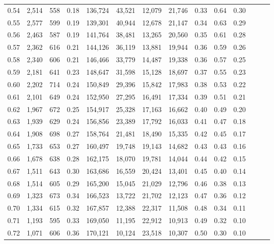 \begin{tabular}{rrrrrrrrrrrrrr}
0.54 &  2,514 &  558 &  0.18 &  136,724 &   43,521 &  12,079 &  21,746 &  0.33 &  0.64 &      0.30 \\
0.55 &  2,577 &  599 &  0.19 &  139,301 &   40,944 &  12,678 &  21,147 &  0.34 &  0.63 &      0.29 \\
0.56 &  2,463 &  587 &  0.19 &  141,764 &   38,481 &  13,265 &  20,560 &  0.35 &  0.61 &      0.28 \\
0.57 &  2,362 &  616 &  0.21 &  144,126 &   36,119 &  13,881 &  19,944 &  0.36 &  0.59 &      0.26 \\
0.58 &  2,340 &  606 &  0.21 &  146,466 &   33,779 &  14,487 &  19,338 &  0.36 &  0.57 &      0.25 \\
0.59 &  2,181 &  641 &  0.23 &  148,647 &   31,598 &  15,128 &  18,697 &  0.37 &  0.55 &      0.23 \\
0.60 &  2,202 &  714 &  0.24 &  150,849 &   29,396 &  15,842 &  17,983 &  0.38 &  0.53 &      0.22 \\
0.61 &  2,101 &  649 &  0.24 &  152,950 &   27,295 &  16,491 &  17,334 &  0.39 &  0.51 &      0.21 \\
0.62 &  1,967 &  672 &  0.25 &  154,917 &   25,328 &  17,163 &  16,662 &  0.40 &  0.49 &      0.20 \\
0.63 &  1,939 &  629 &  0.24 &  156,856 &   23,389 &  17,792 &  16,033 &  0.41 &  0.47 &      0.18 \\
0.64 &  1,908 &  698 &  0.27 &  158,764 &   21,481 &  18,490 &  15,335 &  0.42 &  0.45 &      0.17 \\
0.65 &  1,733 &  653 &  0.27 &  160,497 &   19,748 &  19,143 &  14,682 &  0.43 &  0.43 &      0.16 \\
0.66 &  1,678 &  638 &  0.28 &  162,175 &   18,070 &  19,781 &  14,044 &  0.44 &  0.42 &      0.15 \\
0.67 &  1,511 &  643 &  0.30 &  163,686 &   16,559 &  20,424 &  13,401 &  0.45 &  0.40 &      0.14 \\
0.68 &  1,514 &  605 &  0.29 &  165,200 &   15,045 &  21,029 &  12,796 &  0.46 &  0.38 &      0.13 \\
0.69 &  1,323 &  673 &  0.34 &  166,523 &   13,722 &  21,702 &  12,123 &  0.47 &  0.36 &      0.12 \\
0.70 &  1,334 &  615 &  0.32 &  167,857 &   12,388 &  22,317 &  11,508 &  0.48 &  0.34 &      0.11 \\
0.71 &  1,193 &  595 &  0.33 &  169,050 &   11,195 &  22,912 &  10,913 &  0.49 &  0.32 &      0.10 \\
0.72 &  1,071 &  606 &  0.36 &  170,121 &   10,124 &  23,518 &  10,307 &  0.50 &  0.30 &      0.10 \\

\end{tabular}
